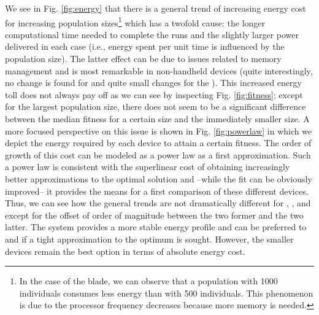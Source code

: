 We see in Fig. \ref{fig:energy}
that there is a general trend of increasing energy cost for increasing
population sizes\footnote{In the case of the blade, we can observe that a population with 1000 individuals consumes less energy than with 500 individuals. This phenomenon is due to the processor frequency decreases because more memory is needed.} which has a
twofold cause: the longer computational time needed to complete the
runs and the slightly larger power delivered in each case (i.e., energy spent
per unit time is influenced by the population size). The latter
effect can be due to issues related to memory management 
and is most
remarkable in non-handheld devices (quite interestingly, no change is
found for \raspberry and quite small changes for the \tabletnsp). This
increased energy toll does not always pay off as we can see by
inspecting Fig. \ref{fig:fitness}; except for the largest population
size, there does not seem to be a significant difference between the
median fitness for a certain size and the immediately smaller size. A
more focused perspective on this issue is shown in
Fig. \ref{fig:powerlaw} in which we depict the energy required by each
device to attain a certain fitness. The order of growth of this cost
can be modeled as a power law as a first approximation. Such a power
law is consistent with the superlinear cost of obtaining increasingly
better approximations to the optimal solution and --while the fit can
be obviously improved-- it provides the means for a first comparison
of these different devices. Thus, we can see how the general trends
are not dramatically different for  \raspberrynsp, \tabletnsp, \laptop
and \iMac except for the offset of order of magnitude between the two
former and the two latter. The \blade system provides a more stable
energy profile and can be preferred to \laptop and \iMac if a tight
approximation to the optimum is sought. However, the smaller devices
remain the best option in terms of absolute energy cost. 





